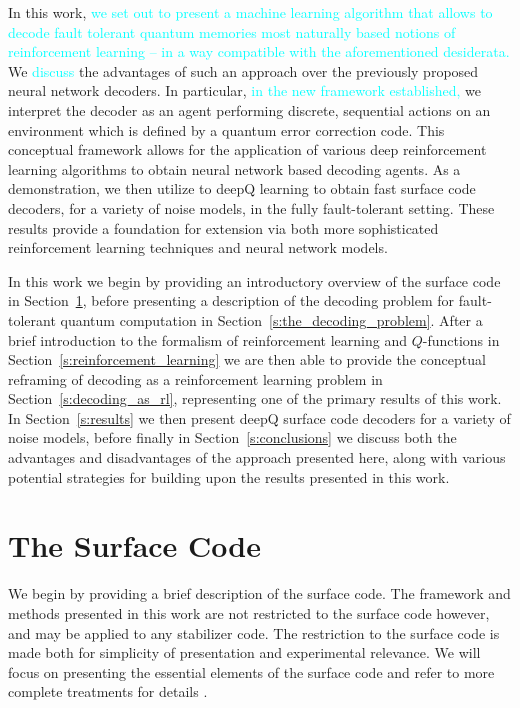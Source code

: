 \documentclass[twocolumn,preprintnumbers,amsmath,amssymb,notitlepage,nofootinbib,longbibliography,superscriptaddress,aps,pra,10pt]{revtex4-1}
\newcommand{\je}[1]{\textcolor{cyan}{#1}}
\begin{document}
	In this work, \je{we set out to present a machine learning algorithm that allows to decode fault tolerant quantum memories most naturally
	based notions
	of reinforcement learning -- in a way compatible with the aforementioned desiderata.}
	We %
	\je{discuss} the advantages of such an approach over the previously proposed neural network decoders.
	In particular, \je{in the new framework established,} we interpret the decoder as an agent performing discrete, sequential actions on an environment which is defined by a quantum error correction code.
	This conceptual framework allows for the application of various deep reinforcement learning algorithms to obtain neural network based decoding agents.
	As a demonstration, we then utilize to deepQ learning to obtain fast surface code decoders, for a variety of noise models, in the fully fault-tolerant setting.
	These results provide a foundation for extension via both more sophisticated reinforcement learning techniques and neural network models.

	In this work we begin by providing an introductory overview of the surface code in Section~\ref{s:the_surface_code}, before presenting a description of the decoding problem for fault-tolerant quantum computation in Section~\ref{s:the_decoding_problem}.
	After a brief introduction to the formalism of reinforcement learning and $Q$-functions in Section~\ref{s:reinforcement_learning} we are then able to provide the conceptual reframing of decoding as a reinforcement learning problem in Section~\ref{s:decoding_as_rl}, representing one of the primary results of this work.
	In Section~\ref{s:results} we then present deepQ surface code decoders for a variety of noise models, before finally in Section~\ref{s:conclusions} we discuss both the advantages and disadvantages of the approach presented here, along with various potential strategies for building upon the results presented in this work.

\section{The Surface Code}\label{s:the_surface_code}

	We begin by providing a brief description of the surface code.
	The framework and methods presented in this work are not restricted to the surface code however, and may be applied to any stabilizer code.
	The restriction to the surface code is made both for simplicity of presentation and experimental relevance.
	We will focus on presenting the essential elements of the surface code and refer to more complete treatments for details \cite{Gottesman97, Terhal15,Litinski18b}.
\end{document}
